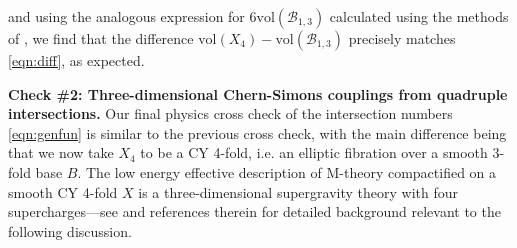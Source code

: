 \documentclass[11pt,oneside,english]{article}
\numberwithin{equation}{section}
\theoremstyle{definition}
\begin{document}
and using the analogous expression for $6 \text{vol}(\mathscr B_{1,3}) $ calculated using the methods of \cite{Jefferson:2022xft},
we find that the difference $\text{vol}(X_4) - \text{vol}(\mathscr B_{1,3})$ precisely matches \cref{eqn:diff}, as expected. \newline


\noindent \textbf{Check \#2: Three-dimensional Chern-Simons couplings from quadruple intersections.} Our final physics cross check of the intersection numbers \cref{eqn:genfun} is similar to the previous cross check, with the main difference being that we now take $X_4$ to be a CY 4-fold, i.e. an elliptic fibration over a smooth 3-fold base $B$. The low energy effective description of M-theory compactified on a smooth CY 4-fold $X$ is a three-dimensional supergravity theory with four supercharges---see \cite{Jefferson:2021bid} and references therein for detailed background relevant to the following discussion. 
\end{document}
